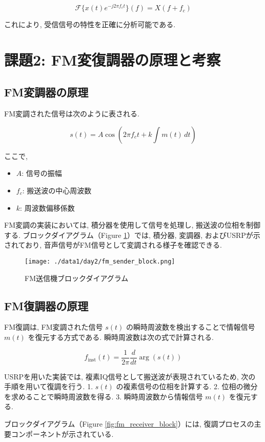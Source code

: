 \documentclass[a4paper, twocolumn]{article} %
\begin{document}
\[
\mathcal{F}\{x(t) e^{-j2\pi f_c t}\}(f) = X(f + f_c)
\]

これにより, 受信信号の特性を正確に分析可能である.


\section{課題2: FM変復調器の原理と考察}

\subsection{FM変調器の原理}
FM変調された信号は次のように表される.

\[
s(t) = A \cos \left( 2 \pi f_c t + k \int m(t) \, dt \right)
\]

ここで,
\begin{itemize}
    \item \( A \): 信号の振幅
    \item \( f_c \): 搬送波の中心周波数
    \item \( k \): 周波数偏移係数
\end{itemize}

FM変調の実装においては, 積分器を使用して信号を処理し, 搬送波の位相を制御する. ブロックダイアグラム（Figure \ref{fig:fm_sender_block}）では, 積分器, 変調器, およびUSRPが示されており, 音声信号がFM信号として変調される様子を確認できる.

\begin{figure}[H]
    \centering
    \texttt{[image: ./data1/day2/fm\_sender\_block.png]}
    \caption{FM送信機ブロックダイアグラム}
    \label{fig:fm_sender_block}
\end{figure}

\subsection{FM復調器の原理}
FM復調は, FM変調された信号 \( s(t) \) の瞬時周波数を検出することで情報信号 \( m(t) \) を復元する方式である. 瞬時周波数は次の式で計算される.

\[
f_{\text{inst}}(t) = \frac{1}{2\pi} \frac{d}{dt} \arg(s(t))
\]

USRPを用いた実装では, 複素IQ信号として搬送波が表現されているため, 次の手順を用いて復調を行う.
1. \( s(t) \) の複素信号の位相を計算する.
2. 位相の微分を求めることで瞬時周波数を得る.
3. 瞬時周波数から情報信号 \( m(t) \) を復元する.

ブロックダイアグラム（Figure \ref{fig:fm_receiver_block}）には, 復調プロセスの主要コンポーネントが示されている.
\end{document}
